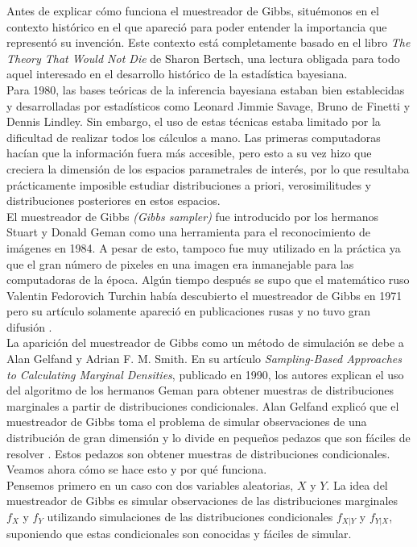 \documentclass[11pt,a4paper]{article}
\begin{document}
Antes de explicar cómo funciona el muestreador de Gibbs, situémonos en el contexto histórico en el que apareció para poder entender la importancia que representó su invención. Este contexto está completamente basado en el libro \textit{The Theory That Would Not Die} de Sharon Bertsch, una lectura obligada para todo aquel interesado en el desarrollo histórico de la estadística bayesiana.\\

Para 1980, las bases teóricas de la inferencia bayesiana estaban bien establecidas y desarrolladas por estadísticos como Leonard Jimmie Savage, Bruno de Finetti y Dennis Lindley. Sin embargo, el uso de estas técnicas estaba limitado por la dificultad de realizar todos los cálculos a mano. Las primeras computadoras hacían que la información fuera más accesible, pero esto a su vez hizo que creciera la dimensión de los espacios parametrales de interés, por lo que resultaba prácticamente imposible estudiar distribuciones a priori, verosimilitudes y distribuciones posteriores en estos espacios.\\

El muestreador de Gibbs \textit{(Gibbs sampler)} fue introducido por los hermanos Stuart y Donald Geman como una herramienta para el reconocimiento de imágenes en 1984. A pesar de esto, tampoco fue muy utilizado en la práctica ya que el gran número de pixeles en una imagen era inmanejable para las computadoras de la época. Algún tiempo después se supo que el matemático ruso Valentin Fedorovich Turchin había descubierto el muestreador de Gibbs en 1971 pero su artículo solamente apareció en publicaciones rusas y no tuvo gran difusión \citep{bertsch}.\\

La aparición del muestreador de Gibbs como un método de simulación se debe a Alan Gelfand y Adrian F. M. Smith. En su artículo \textit{Sampling-Based Approaches to Calculating Marginal Densities}, publicado en 1990, los autores explican el uso del algoritmo de los hermanos Geman para obtener muestras de distribuciones marginales a partir de distribuciones condicionales. Alan Gelfand explicó que el muestreador de Gibbs toma el problema de simular observaciones de una distribución de gran dimensión y lo divide en pequeños pedazos que son fáciles de resolver \citep{bertsch}. Estos pedazos son obtener muestras de distribuciones condicionales. Veamos ahora cómo se hace esto y por qué funciona.\\

Pensemos primero en un caso con dos variables aleatorias, $X$ y $Y$. La idea del muestreador de Gibbs es simular observaciones de las distribuciones marginales $f_X$ y $f_Y$ utilizando simulaciones de las distribuciones condicionales $f_{X|Y}$ y $f_{Y|X}$, suponiendo que estas condicionales son conocidas y fáciles de simular.\\
\end{document}
